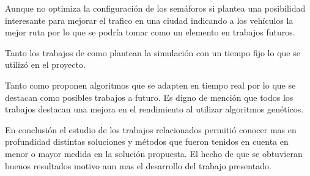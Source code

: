 Aunque \citep{Stolfi2012} no optimiza la configuración de los semáforos si plantea una posibilidad interesante para mejorar el trafico en una ciudad indicando a los vehículos la mejor ruta por lo que se podría tomar como un elemento en trabajos futuros.

Tanto los trabajos de \citep{Teo2010} como \citep{Stolfi2012} plantean la simulación con un tiempo fijo lo que se utilizó en el proyecto.

Tanto \citep{Montana1996} como \citep{Vogel2000}  proponen algoritmos que se adapten en tiempo real por lo que se destacan como posibles trabajos a futuro.
Es digno de mención que todos los trabajos destacan una mejora en el rendimiento al utilizar algoritmos genéticos. 

En conclusión el estudio de los trabajos relacionados permitió conocer mas en profundidad distintas soluciones y métodos que fueron tenidos en cuenta en menor o mayor medida en la solución propuesta. El hecho de que se obtuvieran buenos resultados motivo aun mas el desarrollo del trabajo presentado.
